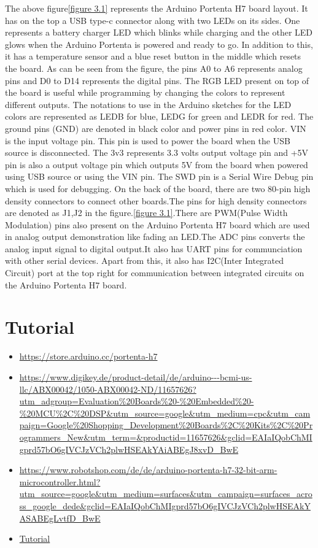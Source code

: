 The above figure\ref{figure 3.1} represents the Arduino Portenta H7 board layout.  It has on the top a USB type-c connector along with two LEDs on its sides. One represents a battery charger LED which blinks while charging and the other LED glows when the Arduino Portenta is powered and ready to go. In addition to this, it has a temperature sensor and a blue reset button in the middle which resets the board. As can be seen from the figure, the pins A0 to A6 represents analog pins and D0 to D14 represents the digital pins.  The RGB LED present on top of the board is useful while programming by changing the colors to represent different outputs. The notations to use in the Arduino sketches for the LED colors are represented as LEDB for blue, LEDG for green and LEDR for red. The ground pins (GND) are denoted in black color and power pins in red color. VIN is the input voltage pin. This pin is used to power the board when the USB source is disconnected.  The 3v3 represents 3.3 volts output voltage pin and +5V pin is also a output voltage pin which outputs 5V from the board when powered using USB source or using the VIN pin. The SWD pin is a Serial Wire Debug pin which is used for debugging. On the back of the board, there are two 80-pin high density connectors to connect other boards.The pins for high density connectors are denoted as J1,J2 in the figure.\ref{figure 3.1}.There are PWM(Pulse Width Modulation) pins also present on the Arduino Portenta H7 board which are used in analog output demonstration like fading an LED.The ADC pins converts the analog input signal to digital output.It also has UART pins for communciation with other serial devices. Apart from this, it also has I2C(Inter Integrated Circuit) port at the top right  for communication between integrated circuits on the Arduino Portenta H7 board.


\section{Tutorial}


\begin{itemize}
  \item \url{https://store.arduino.cc/portenta-h7}
  \item \url{https://www.digikey.de/product-detail/de/arduino---bcmi-us-llc/ABX00042/1050-ABX00042-ND/11657626?utm_adgroup=Evaluation%20Boards%20-%20Embedded%20-%20MCU%2C%20DSP&utm_source=google&utm_medium=cpc&utm_campaign=Google%20Shopping_Development%20Boards%2C%20Kits%2C%20Programmers_New&utm_term=&productid=11657626&gclid=EAIaIQobChMIgprd57bO6gIVCJzVCh2plwHSEAkYAiABEgJ8xvD_BwE}
  \item \url{https://www.robotshop.com/de/de/arduino-portenta-h7-32-bit-arm-microcontroller.html?utm_source=google&utm_medium=surfaces&utm_campaign=surfaces_across_google_dede&gclid=EAIaIQobChMIgprd57bO6gIVCJzVCh2plwHSEAkYASABEgLvtfD_BwE}
  \item \href{https://www.arduino.cc/pro/tutorials/portenta-h7/por-ard-gs}{Tutorial}
\end{itemize}


